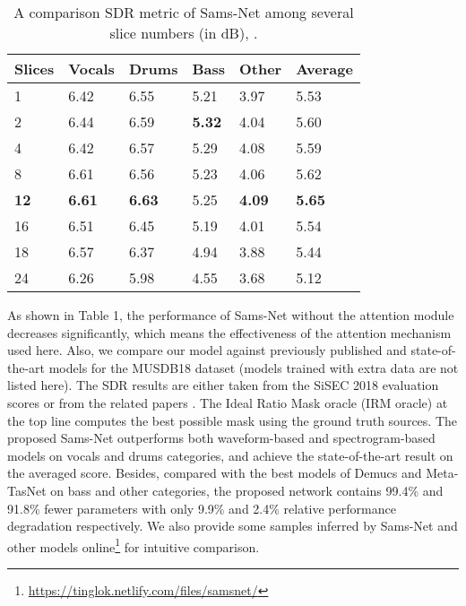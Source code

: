 \documentclass[a4paper]{article}
\begin{document}
\begin{table}[tb]
\centering
\caption{A comparison SDR metric of Sams-Net among several slice numbers (in dB), .}
\begin{tabular}{l|lllll}
\toprule
\textbf{Slices} & \textbf{Vocals} & \textbf{Drums} & \textbf{Bass} & \textbf{Other} & \textbf{Average}  \\
\midrule
1               & 6.42            & 6.55           & 5.21 & 3.97           & 5.53              \\
2               & 6.44            & 6.59           & \textbf{5.32} & 4.04           & 5.60              \\
4               & 6.42            & 6.57           & 5.29 & 4.08           & 5.59              \\
8               & 6.61            & 6.56           & 5.23          & 4.06           & 5.62              \\
\textbf{12}     & \textbf{6.61}   & \textbf{6.63}  & 5.25          & \textbf{4.09}  & \textbf{5.65}     \\
16              & 6.51            & 6.45           & 5.19          & 4.01           & 5.54              \\
18              & 6.57            & 6.37           & 4.94          & 3.88           & 5.44              \\
24              & 6.26            & 5.98           & 4.55          & 3.68           & 5.12              \\
\bottomrule
\end{tabular}
\end{table}

As shown in Table 1, the performance of Sams-Net without the attention module decreases significantly, which means the effectiveness of the attention mechanism used here. Also, we compare our model against previously published and state-of-the-art models for the MUSDB18 dataset (models trained with extra data are not listed here). The SDR results are either taken from the SiSEC 2018 \cite{stoter20182018} evaluation scores \cite{stoller2018wave, takahashi2018mmdenselstm, liu2018denoising}  or from the related papers \cite{stoter2019open, Demucs2019, chandna2017monoaural, lluis2018end, samuel2020meta}. The Ideal Ratio Mask oracle (IRM oracle) \cite{stoter2019open} at the top line computes the best possible mask using the ground truth sources. The proposed Sams-Net outperforms both waveform-based and spectrogram-based models on vocals and drums categories, and achieve the state-of-the-art result on the averaged score. Besides, compared with the best models of Demucs \cite{Demucs2019} and Meta-TasNet \cite{samuel2020meta} on bass and other categories, the proposed network contains 99.4\% and 91.8\% fewer parameters with only 9.9\% and 2.4\% relative performance degradation respectively. We also provide some samples inferred by Sams-Net and other models \cite{stoter2019open, Demucs2019} online\footnote{\url{https://tinglok.netlify.com/files/samsnet/}} for intuitive comparison.
\end{document}
